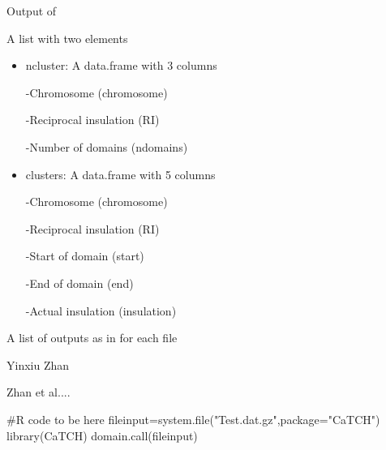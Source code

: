 \documentclass[a4paper]{book}
\begin{document}
\begin{Value}
Output of

\begin{ldescription}
\item[\code{\code{domain.call}}]  A list with two elements
\begin{itemize}

\item ncluster: A data.frame with 3 columns

-Chromosome (chromosome)

-Reciprocal insulation (RI)

-Number of domains (ndomains)



\item clusters: A data.frame with 5 columns

-Chromosome (chromosome)

-Reciprocal insulation (RI)

-Start of domain (start)

-End of domain (end)

-Actual insulation (insulation)



\end{itemize}
	


\item[\code{\code{domain.call.parallel}}]   A list of outputs as in  for each file	
\end{ldescription}
\end{Value}
%
\begin{Author}\relax
Yinxiu Zhan
\end{Author}
%
\begin{References}\relax
Zhan et al....
\end{References}
%
\begin{Examples}
\begin{ExampleCode}
#R code to be here
	fileinput=system.file("Test.dat.gz",package="CaTCH")
	library(CaTCH)
	domain.call(fileinput)
\end{ExampleCode}
\end{Examples}
\printindex{}
\end{document}
